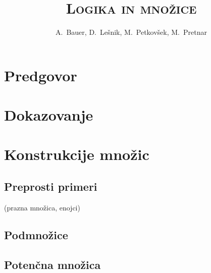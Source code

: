 \documentclass[11pt,a4paper,twoside]{book}
\newcommand{\note}[1]{{\small\textcolor{notecolor}{(#1)}}}
\begin{document}
   
	
	\title{\Huge \textbf{\textsc{Logika in množice}}}
	\author{A.~Bauer, D.~Lešnik, M.~Petkovšek, M.~Pretnar}
	
	\maketitle
   
   

   \chapter*{Predgovor}%


	
	
	\tableofcontents
	\listoftables
	
	
	
	
	
	
	
	\chapter{Dokazovanje}\label{POGLAVJE: Dokazovanje}
	
	\chapter{Konstrukcije množic}
		\section{Preprosti primeri}
			\note{prazna množica, enojci}
		\section{Podmnožice}
		\section{Potenčna množica}
\end{document}

